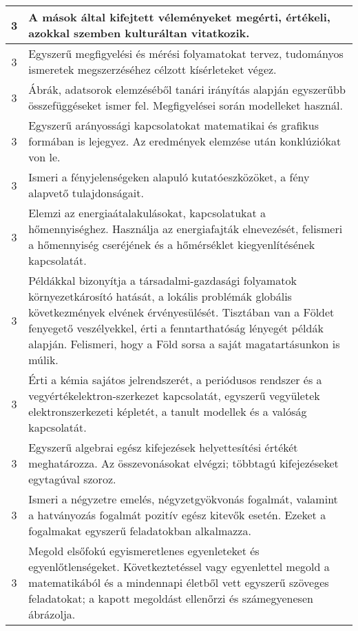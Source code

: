 \begin{longtable}{c | p{12cm} }
                                
                                          3 &  A mások által kifejtett véleményeket megérti, értékeli, azokkal szemben kulturáltan vitatkozik. \\ \hline
                                          3 &  Egyszerű megfigyelési és mérési folyamatokat tervez, tudományos ismeretek megszerzéséhez célzott kísérleteket végez. \\ \hline
                                          3 &  Ábrák, adatsorok elemzéséből tanári irányítás alapján egyszerűbb összefüggéseket ismer fel. Megfigyelései során modelleket használ.  \\ \hline
                                          3 &  Egyszerű arányossági kapcsolatokat matematikai és grafikus formában is lejegyez. Az eredmények elemzése után konklúziókat von le. \\ \hline
                                          3 &  Ismeri a fényjelenségeken alapuló kutatóeszközöket, a fény alapvető tulajdonságait. \\ \hline
                                          3 &  Elemzi az energiaátalakulásokat, kapcsolatukat a hőmennyiséghez. Használja az energiafajták elnevezését, felismeri a hőmennyiség cseréjének és a hőmérséklet kiegyenlítésének kapcsolatát. \\ \hline
                                          3 &  Példákkal bizonyítja a társadalmi-gazdasági folyamatok környezetkárosító hatását, a lokális problémák globális következmények elvének érvényesülését. Tisztában van a Földet fenyegető veszélyekkel, érti a fenntarthatóság lényegét példák alapján. Felismeri, hogy a Föld sorsa a saját magatartásunkon is múlik. \\ \hline
                                          3 &  Érti a kémia sajátos jelrendszerét, a periódusos rendszer és a vegyértékelektron-szerkezet kapcsolatát, egyszerű vegyületek elektronszerkezeti képletét, a tanult modellek és a valóság kapcsolatát. \\ \hline
                                          3 &  Egyszerű algebrai egész kifejezések helyettesítési értékét meghatározza. Az összevonásokat elvégzi; többtagú kifejezéseket egytagúval szoroz. \\ \hline
                                          3 &  Ismeri a négyzetre emelés, négyzetgyökvonás fogalmát, valamint a hatványozás fogalmát pozitív egész kitevők esetén. Ezeket a fogalmakat egyszerű feladatokban alkalmazza. \\ \hline
                                          3 &  Megold elsőfokú egyismeretlenes egyenleteket és egyenlőtlenségeket. Következtetéssel vagy egyenlettel megold a matematikából és a mindennapi életből vett egyszerű szöveges feladatokat; a kapott megoldást ellenőrzi és számegyenesen ábrázolja. \\ \hline

\end{longtable}
